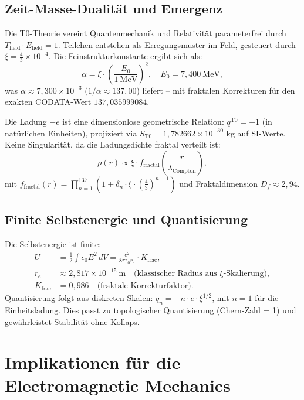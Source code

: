 	\subsection{Zeit-Masse-Dualität und Emergenz}
	Die T0-Theorie vereint Quantenmechanik und Relativität parameterfrei durch $T_{\text{field}} \cdot E_{\text{field}} = 1$. Teilchen entstehen als Erregungsmuster im Feld, gesteuert durch $\xi = \frac{4}{3} \times 10^{-4}$. Die Feinstrukturkonstante ergibt sich als:
	\begin{equation}
		\alpha = \xi \cdot \left( \frac{E_0}{1~\mathrm{MeV}} \right)^2, \quad E_0 = 7{,}400~\mathrm{MeV},
	\end{equation}
	was $\alpha \approx 7{,}300 \times 10^{-3}$ ($1/\alpha \approx 137{,}00$) liefert – mit fraktalen Korrekturen für den exakten CODATA-Wert $137{,}035999084$.
	
	Die Ladung $-e$ ist eine dimensionlose geometrische Relation: $q^{\mathrm{T0}} = -1$ (in natürlichen Einheiten), projiziert via $S_{\mathrm{T0}} = 1{,}782662 \times 10^{-30}$ kg auf SI-Werte. Keine Singularität, da die Ladungsdichte fraktal verteilt ist:
	\begin{equation}
		\rho(r) \propto \xi \cdot f_{\text{fractal}}\left( \frac{r}{\lambda_{\text{Compton}}} \right),
	\end{equation}
	mit $f_{\text{fractal}}(r) = \prod_{n=1}^{137} \left(1 + \delta_n \cdot \xi \cdot \left(\frac{4}{3}\right)^{n-1}\right)$ und Fraktaldimension $D_f \approx 2{,}94$.
	
	\subsection{Finite Selbstenergie und Quantisierung}
	Die Selbstenergie ist finite:
	\begin{align}
		U &= \frac{1}{2} \int \epsilon_0 E^2 \, dV = \frac{e^2}{8\pi \epsilon_0 r_e} \cdot K_{\text{frac}}, \\
		r_e &\approx 2{,}817 \times 10^{-15}~\mathrm{m} \quad \text{(klassischer Radius aus $\xi$-Skalierung)}, \\
		K_{\text{frac}} &= 0{,}986 \quad \text{(fraktale Korrekturfaktor)}.
	\end{align}
	Quantisierung folgt aus diskreten Skalen: $q_n = -n \cdot e \cdot \xi^{1/2}$, mit $n=1$ für die Einheitsladung. Dies passt zu topologischer Quantisierung (Chern-Zahl = 1) und gewährleistet Stabilität ohne Kollaps.
	
	\section{Implikationen für die Electromagnetic Mechanics}
	\label{sec:emm}
	
